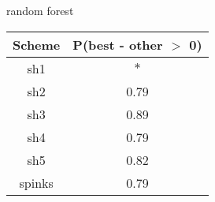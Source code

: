 \begin{subtable}[b]{0.3\linewidth}
  \caption{random forest}
  \centering
  \begin{tabular}{ c c }
    \hline
    Scheme & P(best - other \(>\) 0) \\ 
    \hline
    \hline
    sh1 & \(\ast\) \\ 
    sh2 & 0.79 \\
    sh3 & 0.89 \\ 
    sh4 & 0.79 \\ 
    sh5 & 0.82 \\ 
    spinks & 0.79 \\ 
    \hline
  \end{tabular}
  \label{rfdif}
\end{subtable}
